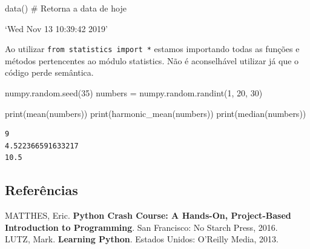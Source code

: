 \documentclass[
  letterpaper,
  DIV=11,
  numbers=noendperiod]{scrreprt}
\newenvironment{Shaded}{\begin{snugshade}}{\end{snugshade}}
\newcommand{\BuiltInTok}[1]{\textcolor[rgb]{0.00,0.23,0.31}{#1}}
\newcommand{\CommentTok}[1]{\textcolor[rgb]{0.37,0.37,0.37}{#1}}
\newcommand{\DecValTok}[1]{\textcolor[rgb]{0.68,0.00,0.00}{#1}}
\newcommand{\NormalTok}[1]{\textcolor[rgb]{0.00,0.23,0.31}{#1}}
\newcommand{\OperatorTok}[1]{\textcolor[rgb]{0.37,0.37,0.37}{#1}}
\begin{document}
\begin{Shaded}
\begin{Highlighting}[]
\NormalTok{data()                              }\CommentTok{\# Retorna a data de hoje}
\end{Highlighting}
\end{Shaded}

\begin{tcolorbox}[enhanced jigsaw, breakable, leftrule=.75mm, left=2mm, opacityback=0, bottomrule=.15mm, toprule=.15mm, rightrule=.15mm, arc=.35mm, colback=white]

`Wed Nov 13 10:39:42 2019'

\end{tcolorbox}

Ao utilizar \texttt{from\ statistics\ import\ *} estamos importando
todas as funções e métodos pertencentes ao módulo statistics. Não é
aconselhável utilizar já que o código perde semântica.

\begin{Shaded}
\begin{Highlighting}[]
\NormalTok{numpy.random.seed(}\DecValTok{35}\NormalTok{)}
\NormalTok{numbers }\OperatorTok{=}\NormalTok{ numpy.random.randint(}\DecValTok{1}\NormalTok{, }\DecValTok{20}\NormalTok{, }\DecValTok{30}\NormalTok{)}

\BuiltInTok{print}\NormalTok{(mean(numbers))}
\BuiltInTok{print}\NormalTok{(harmonic\_mean(numbers))}
\BuiltInTok{print}\NormalTok{(median(numbers))}
\end{Highlighting}
\end{Shaded}

\begin{tcolorbox}[enhanced jigsaw, breakable, leftrule=.75mm, left=2mm, opacityback=0, bottomrule=.15mm, toprule=.15mm, rightrule=.15mm, arc=.35mm, colback=white]

\begin{verbatim}
9
4.522366591633217
10.5
\end{verbatim}

\end{tcolorbox}

\hypertarget{referuxeancias}{%
\subsection{Referências}\label{referuxeancias}}

MATTHES, Eric. \textbf{Python Crash Course: A Hands-On, Project-Based
Introduction to Programming}. San Francisco: No Starch Press, 2016.\\
LUTZ, Mark. \textbf{Learning Python}. Estados Unidos: O'Reilly Media,
2013.
\end{document}
